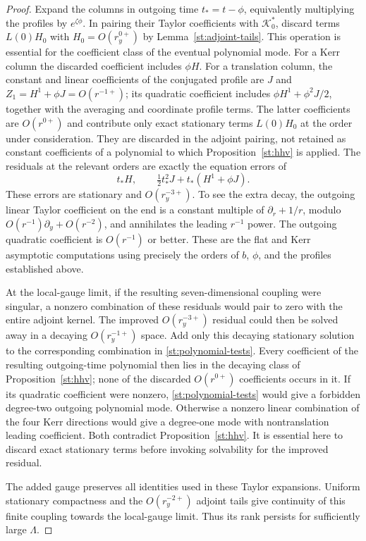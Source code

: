 \begin{proof}
Expand the columns in outgoing time $t_*=t-\phi$, equivalently
multiplying the profiles by $e^{\zeta\phi}$.  In pairing their
Taylor coefficients with $\mathcal K_0^*$, discard terms
$L(0)H_0$ with $H_0=O(r_y^{0+})$ by
Lemma~\ref{st:adjoint-tails}.  This operation is essential for
the coefficient class of the eventual polynomial mode.
For a Kerr column the discarded coefficient includes $\phi H$.
For a translation column, the constant and linear coefficients
of the conjugated profile are $J$ and
$Z_1=H^1+\phi J=O(r^{-1+})$; its quadratic coefficient includes
$\phi H^1+\phi^2J/2$, together with the averaging and coordinate
profile terms.  The latter coefficients are $O(r^{0+})$ and
contribute only exact stationary terms $L(0)H_0$ at the order
under consideration.  They are discarded in the adjoint pairing,
not retained as constant coefficients of a polynomial to which
Proposition~\ref{st:hhv} is applied.  The residuals at the relevant
orders are exactly the equation errors of
\begin{equation}\label{st:polynomial-tests}
 t_*H,\qquad
 \tfrac12t_*^2J+t_*(H^1+\phi J).
\end{equation}
These errors are stationary and $O(r_y^{-3+})$.  To see the
extra decay, the outgoing linear Taylor coefficient on the end
is a constant multiple of $\partial_r+1/r$, modulo
$O(r^{-1})\partial_y+O(r^{-2})$, and annihilates the leading
$r^{-1}$ power.  The outgoing quadratic coefficient is
$O(r^{-1})$ or better.  These are the flat and Kerr asymptotic
computations using precisely the
orders of $b$, $\phi$, and the profiles established above.

At the local-gauge limit, if the resulting seven-dimensional
coupling were singular, a nonzero combination of these residuals
would pair to zero with the entire adjoint kernel.  The improved
$O(r_y^{-3+})$ residual could then be solved away in a decaying
$O(r_y^{-1+})$ space.  Add only this decaying stationary solution
to the corresponding combination in \eqref{st:polynomial-tests}.
Every coefficient of the resulting outgoing-time polynomial
then lies in the decaying class of Proposition~\ref{st:hhv};
none of the discarded $O(r^{0+})$ coefficients occurs in it.
If its quadratic coefficient were
nonzero, \eqref{st:polynomial-tests} would give a forbidden
degree-two outgoing polynomial mode.  Otherwise a nonzero
linear combination of the four Kerr directions would give a
degree-one mode with nontranslation leading coefficient.
Both contradict Proposition~\ref{st:hhv}.
It is essential here to discard exact stationary terms before
invoking solvability for the improved residual.

The added gauge preserves all identities used in these Taylor
expansions.  Uniform stationary compactness and the
$O(r_y^{-2+})$ adjoint tails give continuity of this finite
coupling towards the local-gauge limit.  Thus its rank persists
for sufficiently large $\Lambda$.
\end{proof}

